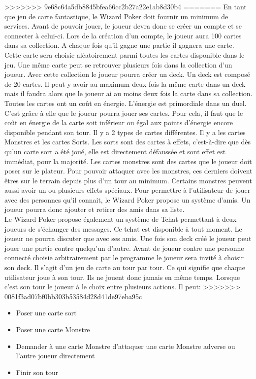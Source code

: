 \documentclass[11pt,a4paper]{article}
\begin{document}
>>>>>>> 9e68c64a5db8845bfea66cc2b27a22e1ab8d30b4
=======
En tant que jeu de carte fantastique, le Wizard Poker doit fournir un minimum de services. Avant de pouvoir jouer, le joueur devra donc se créer un compte et se connecter à celui-ci.  Lors de la création d'un compte, le joueur aura 100 cartes dans sa \gls{collection}.  A chaque fois qu'il gagne une partie il gagnera une carte.  Cette carte sera choisie aléatoirement parmi toutes les cartes disponible dans le jeu.  Une même carte peut se retrouver plusieurs fois dans la \gls{collection} d'un joueur.  Avec cette \gls{collection} le joueur pourra créer un \gls{deck}.  Un \gls{deck} est composé de 20 cartes.  Il peut y avoir au maximum deux fois la même carte dans un \gls{deck} mais il faudra alors que le joueur ai au moins deux fois la carte dans sa \gls{collection}.\\
Toutes les cartes ont un coût en énergie. L'énergie est primordiale dans un duel. C'est grâce à elle que le joueur pourra jouer ses cartes. Pour cela, il faut que le coût en énergie de la carte soit inférieur ou égal aux points d'énergie encore disponible pendant son tour.
Il y a 2 types de cartes différentes. Il y a les cartes Monstres et les cartes Sorts. Les sorts sont des cartes à effets, c'est-à-dire que dès qu'un carte sort a été joué, elle est directement défaussée et sont effet est immédiat, pour la majorité.
Les cartes monstres sont des cartes que le joueur doit poser sur le plateur. Pour pouvoir attaquer avec les monstres, ces derniers doivent êtres sur le terrain depuis plus d'un tour au minimum. Certains monstres peuvent aussi avoir un ou plusieurs effets spéciaux.
Pour permettre à l'utilisateur de jouer avec des personnes qu'il connait, le Wizard Poker propose un système d'amis.  Un joueur pourra donc ajouter et retirer des amis dans sa liste.\\
Le Wizard Poker propose également un système de Tchat permettant à deux joueurs de s'échanger des messages.  Ce tchat est disponible à tout moment.  Le joueur ne pourra discuter que avec ses amis.
Une fois son \gls{deck} créé le joueur peut jouer une partie contre quelqu'un d'autre.  Avant de joueur contre une personne connecté choisie arbitrairement par le programme le joueur sera invité à choisir son \gls{deck}.  Il s'agit d'un jeu de carte au tour par tour.  Ce qui signifie que chaque utilisateur joue à son tour.  Ils ne jouent donc jamais en même temps.  Lorsque c'est son tour le joueur à le choix entre plusieurs actions. Il peut:
>>>>>>> 0081f3ad07bf0bb303b53584d28d41de97eba95c
\begin{itemize}
 \item[\textbullet] Poser une carte sort
 \item[\textbullet] Poser une carte Monstre
 \item[\textbullet] Demander à une carte Monstre d'attaquer une carte Monstre adverse ou l'autre joueur directement
 \item[\textbullet] Finir son tour
\end{itemize}
\end{document}
